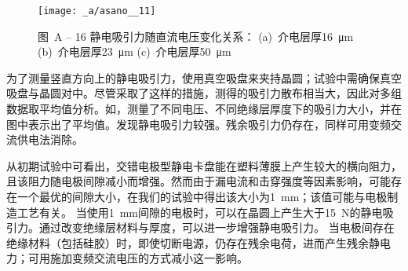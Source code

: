 
\begin{figure}[tbhp]
\centering
\texttt{[image: \_a/asano\_\_11]}
\caption*{图~A -- 16\hspace{1em}  静电吸引力随直流电压变化关系：%
\quad (a)\ 介电层厚\SI{16}{\um}%
\quad (b)\ 介电层厚\SI{23}{\um}%
\quad (c)\ 介电层厚\SI{50}{\um}%
}
\end{figure}

为了测量竖直方向上的静电吸引力，使用真空吸盘来夹持晶圆；试验中需确保真空吸盘与晶圆对中。尽管采取了这样的措施，测得的吸引力散布相当大，因此对多组数据取平均值分析。如，测量了不同电压、不同绝缘层厚度下的吸引力大小，并在图中表示出了平均值。发现静电吸引力较强\footnotemark{}。残余吸引力仍存在，同样可用变频交流供电法消除。


从初期试验中可看出，交错电极型静电卡盘能在塑料薄膜上产生较大的横向阻力，且该阻力随电极间隙减小而增强。然而由于漏电流和击穿强度等因素影响，可能存在一个最优的间隙大小，在我们的试验中得出该大小为\SI{1}{\mm}；该值可能与电极制造工艺有关。
当使用\SI{1}{\mm}间隙的电极时，可以在晶圆上产生大于\SI{15}{\N}的静电吸引力。通过改变绝缘层材料与厚度，可以进一步增强静电吸引力。
当电极间存在绝缘材料（包括硅胶）时，即使切断电源，仍存在残余电荷，进而产生残余静电力；可用施加变频交流电压的方式减小这一影响。

